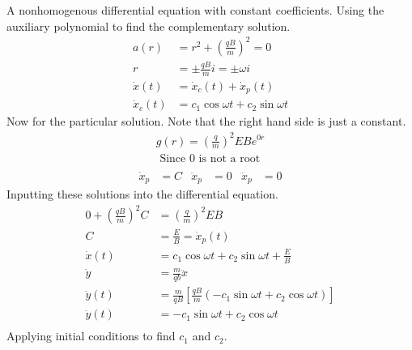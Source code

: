 \documentclass[]{article}
\begin{document}
	A nonhomogenous differential equation with constant coefficients. Using the auxiliary polynomial to find the complementary solution.
	\begin{equation}
		\begin{split}
			a(r) &= r^2 + \left( \frac{qB}{m} \right)^2 = 0 \\
			r& = \pm \frac{qB}{m}i = \pm \omega i \\
			\dot{x}(t) &= \dot{x}_c(t) + \dot{x}_p(t) \\
			\dot{x}_c(t) &= c_1\cos \omega t + c_2 \sin \omega t
		\end{split}
	\end{equation}
	Now for the particular solution. Note that the right hand side is just a constant.
	\begin{equation}
		\begin{split}
			g(r) = \left( \frac{q}{m} \right)^2 EB e^{0r} \\
			\text{ Since 0 is not a root} \\
		\end{split}
	\end{equation}
	\begin{equation}
		\begin{aligned}
			\dot{x}_p &= C & \ddot{x}_p &= 0 & \dddot{x}_p &= 0
		\end{aligned}
	\end{equation}
	Inputting these solutions into the differential equation.
	\begin{equation}
		\begin{split}
			0 + \left( \frac{qB}{m} \right)^2 C &= \left( \frac{q}{m} \right)^2 EB \\
			C &= \frac{E}{B} = \dot{x}_p(t) \\
			\dot{x}(t) &= c_1\cos \omega t + c_2 \sin \omega t + \frac{E}{B} \\
			\dot{y} &= \frac{m}{qb} \ddot{x} \\
			\dot{y}(t) &= \frac{m}{qB} \left[ \frac{qB}{m} \left( -c_1 \sin \omega t + c_2 \cos \omega t \right) \right] \\
			\dot{y}(t) &= -c_1 \sin \omega t + c_2 \cos \omega t \\
		\end{split}
	\end{equation}
	Applying initial conditions to find $c_1$ and $c_2$.
\end{document}
